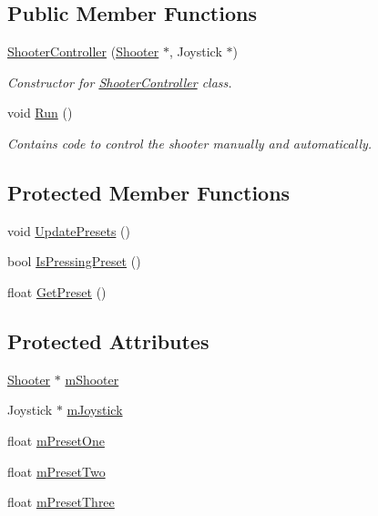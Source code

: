 \subsection*{\-Public \-Member \-Functions}
\begin{DoxyCompactItemize}
\item 
\hyperlink{class_shooter_controller_afd27dad7435fc4f715054bccdb9c494f}{\-Shooter\-Controller} (\hyperlink{class_shooter}{\-Shooter} $\ast$, \-Joystick $\ast$)
\begin{DoxyCompactList}\small\item\em \-Constructor for \hyperlink{class_shooter_controller}{\-Shooter\-Controller} class. \end{DoxyCompactList}\item 
void \hyperlink{class_shooter_controller_ae52ac994a8aba8107b8345fcfca5295e}{\-Run} ()
\begin{DoxyCompactList}\small\item\em \-Contains code to control the shooter manually and automatically. \end{DoxyCompactList}\end{DoxyCompactItemize}
\subsection*{\-Protected \-Member \-Functions}
\begin{DoxyCompactItemize}
\item 
void \hyperlink{class_shooter_controller_a7ebc6574dfe149fc6511e300e9b1455c}{\-Update\-Presets} ()
\item 
bool \hyperlink{class_shooter_controller_ac2dd9efc70a3f3a58949fbf2d3c343e0}{\-Is\-Pressing\-Preset} ()
\item 
float \hyperlink{class_shooter_controller_aba0407414a2db7209d5f0dc0ef974b9e}{\-Get\-Preset} ()
\end{DoxyCompactItemize}
\subsection*{\-Protected \-Attributes}
\begin{DoxyCompactItemize}
\item 
\hyperlink{class_shooter}{\-Shooter} $\ast$ \hyperlink{class_shooter_controller_a7c78bd9820decf6e74f4c35153175ef1}{m\-Shooter}
\item 
\-Joystick $\ast$ \hyperlink{class_shooter_controller_aafcecf3f9f5089458256a5705e2b3ce7}{m\-Joystick}
\item 
float \hyperlink{class_shooter_controller_a62a972cfb614e5ad25654c82cfa9d2ff}{m\-Preset\-One}
\item 
float \hyperlink{class_shooter_controller_a450f9cbb5adbc3701538f3d421fc9e26}{m\-Preset\-Two}
\item 
float \hyperlink{class_shooter_controller_a06e7e739e389e3b04dfc54653111e4cd}{m\-Preset\-Three}
\end{DoxyCompactItemize}


